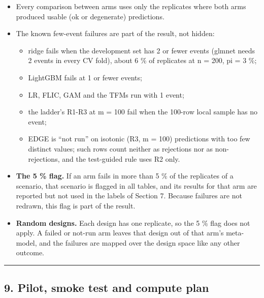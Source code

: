 \documentclass[
  10pt,
]{article}
\providecommand{\tightlist}{%
  \setlength{\itemsep}{0pt}\setlength{\parskip}{0pt}}
\begin{document}
\begin{itemize}
  \begin{itemize}
  \tightlist
  \item
    Every comparison between arms uses only the replicates
    where both arms produced usable (ok or degenerate)
    predictions.
  \item
    The known few-event failures are part of the result, not
    hidden:

    \begin{itemize}
    \tightlist
    \item
      ridge fails when the development set has 2 or fewer
      events (glmnet needs 2 events in every CV fold), about
      6 \% of replicates at n = 200, pi = 3 \%;
    \item
      LightGBM fails at 1 or fewer events;
    \item
      LR, FLIC, GAM and the TFMs run with 1 event;
    \item
      the ladder's R1-R3 at m = 100 fail when the 100-row
      local sample has no event;
    \item
      EDGE is ``not run'' on isotonic (R3, m = 100)
      predictions with too few distinct values; such rows
      count neither as rejections nor as non-rejections, and
      the test-guided rule uses R2 only.
    \end{itemize}
  \item
    \textbf{The 5 \% flag.} If an arm fails in more than 5
    \% of the replicates of a scenario, that scenario is
    flagged in all tables, and its results for that arm are
    reported but not used in the labels of Section 7.
    Because failures are not redrawn, this flag is part of
    the result.
  \item
    \textbf{Random designs.} Each design has one replicate,
    so the 5 \% flag does not apply. A failed or not-run arm
    leaves that design out of that arm's meta-model, and the
    failures are mapped over the design space like any other
    outcome.
  \end{itemize}
\end{itemize}

\begin{center}\rule{0.5\linewidth}{0.5pt}\end{center}

\subsection{9. Pilot, smoke test and compute
plan}\label{pilot-smoke-test-and-compute-plan}
\end{document}
